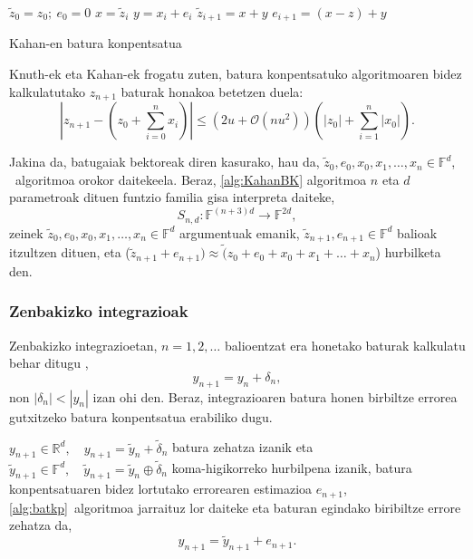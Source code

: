 \begin{algorithm}[H]
 \BlankLine
  $\tilde z_0= z_0; \ e_0=0$\;
  {
   \BlankLine
    $x=\tilde z_i$\;
    $y= x_i+e_i$\;
    $\tilde z_{i+1}=x+y$\;
    $e_{i+1}=(x-z)+y$\;
   \BlankLine
  }
 \caption{Kahan-en batura konpentsatua}
   \label{alg:KahanBK}
\end{algorithm}

Knuth-ek eta Kahan-ek \cite{Muller2009} frogatu zuten,  batura konpentsatuko algoritmoaren bidez kalkulatutako $z_{n+1}$ baturak honakoa betetzen duela:
\begin{equation*}
\left | z_{n+1} - (z_0+\sum_{i=0}^{n} x_i) \right | \leq (2u+ \mathcal{O}(nu^2)) \left(|z_0|+\sum_{i=1}^{n} |x_0|\right).
\end{equation*}

Jakina da, batugaiak bektoreak diren kasurako, hau da, $\tilde z_0, e_0, x_0, x_1, \dots, x_n \in \mathbb{F}^d$, ~algoritmoa orokor daitekeela. Beraz, \ref{alg:KahanBK} algoritmoa $n$ eta $d$ parametroak dituen funtzio familia gisa interpreta daiteke,
\begin{equation}
\label{eq:batsd}
S_{n,d} : \mathbb{F}^{(n+3)d} \rightarrow \mathbb{F}^{2d},
\end{equation}
zeinek $\tilde z_0, e_0, x_0, x_1, \dots, x_n \in \mathbb{F}^d$ argumentuak emanik, $\tilde z_{n+1}, e_{n+1} \in \mathbb{F}^d$ balioak itzultzen dituen, eta ($\tilde z_{n+1}+e_{n+1}) \approx \tilde (z_0+e_0+x_0+x_1+ \dots+x_n$) hurbilketa den.

\subsubsection*{Zenbakizko integrazioak}
 
Zenbakizko integrazioetan, $n=1,2,\dots$ balioentzat era honetako baturak kalkulatu behar ditugu \cite{Hairer2006},
\begin{equation*}
y_{n+1}=y_n+\delta_n,
\end{equation*}  
non $|\delta_n|<|y_n|$ izan ohi den. Beraz, integrazioaren batura honen birbiltze errorea gutxitzeko batura konpentsatua erabiliko dugu.  

$y_{n+1} \in \mathbb{R}^{d},\quad y_{n+1}=\tilde y_{n}+\tilde \delta_n$ batura zehatza izanik eta $\tilde y_{n+1} \in \mathbb{F}^{d}, \quad \tilde y_{n+1}=\tilde y_{n} \oplus \tilde \delta_n$ koma-higikorreko hurbilpena izanik, batura konpentsatuaren bidez lortutako errorearen estimazioa $e_{n+1}$, \ref{alg:batkp}~algoritmoa jarraituz lor daiteke eta baturan egindako biribiltze errore zehatza da, 
\begin{equation}
y_{n+1}=\tilde {y}_{n+1}+e_{n+1}. 
\end{equation}

